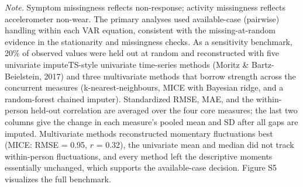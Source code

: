 \begin{table}[H]
\par\vspace{3pt}\noindent\parbox{\textwidth}{\footnotesize\textit{Note.} Symptom missingness reflects non-response; activity missingness reflects accelerometer non-wear. The primary analyses used available-case (pairwise) handling within each VAR equation, consistent with the missing-at-random evidence in the stationarity and missingness checks. As a sensitivity benchmark, 20\% of observed values were held out at random and reconstructed with five univariate imputeTS-style univariate time-series methods (Moritz \& Bartz-Beielstein, 2017) and three multivariate methods that borrow strength across the concurrent measures (k-nearest-neighbours, MICE with Bayesian ridge, and a random-forest chained imputer). Standardized RMSE, MAE, and the within-person held-out correlation are averaged over the four core measures; the last two columns give the change in each measure's pooled mean and SD after all gaps are imputed. Multivariate methods reconstructed momentary fluctuations best (MICE: RMSE = 0.95, $r$ = 0.32), the univariate mean and median did not track within-person fluctuations, and every method left the descriptive moments essentially unchanged, which supports the available-case decision. Figure S5 visualizes the full benchmark.}
\endgroup
\end{table}
